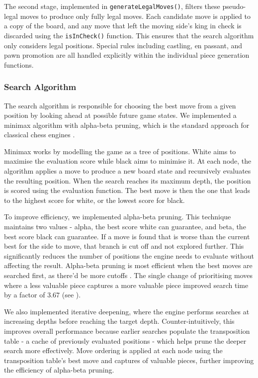 \documentclass[12pt,titlepage,a4paper]{article}
\begin{document}
    The second stage, implemented in \texttt{generateLegalMoves()}, filters these pseudo-legal moves to produce only fully legal moves. Each candidate move is applied to a copy of the board, and any move that left the moving side's king in check is discarded using the \texttt{isInCheck()} function. This ensures that the search algorithm only considers legal positions. Special rules including castling, en passant, and pawn promotion are all handled explicitly within the individual piece generation functions.

    \subsubsection{Search Algorithm}
    The search algorithm is responsible for choosing the best move from a given position by looking ahead at possible future game states. We implemented a minimax algorithm with alpha-beta pruning, which is the standard approach for classical chess engines \citep{cpwiki-minimax}.

    Minimax works by modelling the game as a tree of positions. White aims to maximise the evaluation score while black aims to minimise it. At each node, the algorithm applies a move to produce a new board state and recursively evaluates the resulting position. When the search reaches its maximum depth, the position is scored using the evaluation function. The best move is then the one that leads to the highest score for white, or the lowest score for black.

    To improve efficiency, we implemented alpha-beta pruning. This technique maintains two values - alpha, the best score white can guarantee, and beta, the best score black can guarantee. If a move is found that is worse than the current best for the side to move, that branch is cut off and not explored further. This significantly reduces the number of positions the engine needs to evaluate without affecting the result. Alpha-beta pruning is most efficient when the best moves are searched first, as there'd be more cutoffs \citep{vrzina-chess-engine}. The single change of prioritising moves where a less valuable piece captures a more valuable piece improved search time by a factor of 3.67 (see ).

    We also implemented iterative deepening, where the engine performs searches at increasing depths before reaching the target depth. Counter-intuitively, this improves overall performance because earlier searches populate the transposition table - a cache of previously evaluated positions - which helps prune the deeper search more effectively. Move ordering is applied at each node using the transposition table's best move and captures of valuable pieces, further improving the efficiency of alpha-beta pruning.
\end{document}
